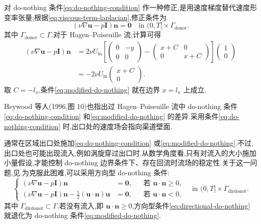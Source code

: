 \begin{example}
对 do-nothing 条件\cref{eq:do-nothing-condition} 作一种修正,是用速度梯度替代速度形变率张量;根据\cref{eq:viscous-term-laplacian},修正条件为
\begin{equation}\label{eq:modified-do-nothing}
  (\nu\nabla\bm{u}-p\bm{I})\bm{n}=\bm{0}
  \quad\text{in }(0,T]\times\Gamma_{\mathrm{donot}}.
\end{equation}
其中 $\Gamma_{\mathrm{donot}}\subset\Gamma$.对于 Hagen--Poiseuille 流,计算可得
\begin{equation*}
\begin{aligned}
  (\nu\nabla\bm{u}-p\bm{I})\bm{n}
  &=2\nu U_{\mathrm{in}}
    \left[
      \begin{pmatrix}0&-y\\0&0\end{pmatrix}
      -\begin{pmatrix}x+C&0\\0&x+C\end{pmatrix}
    \right]
    \begin{pmatrix}1\\0\end{pmatrix}\\
  &=-2\nu U_{\mathrm{in}}\begin{pmatrix}x+C\\0\end{pmatrix}.
\end{aligned}
\end{equation*}
取 $C=-l_x$,条件\cref{eq:modified-do-nothing} 就在边界 $x=l_x$ 上成立.

Heywood 等人(1996,图 10)也指出过 Hagen--Poiseuille 流中 do-nothing 条件\cref{eq:do-nothing-condition} 和\cref{eq:modified-do-nothing} 的差异.采用条件\cref{eq:do-nothing-condition} 时,出口处的速度场会指向渠道壁面.
\end{example}

\begin{note}\label{note:directional-do-nothing}
通常在区域出口处施加\cref{eq:do-nothing-condition} 或\cref{eq:modified-do-nothing}.不过,出口处也可能出现流入,例如涡旋穿过出口时.从数学角度看,只有对流入的大小施加小量假设,才能控制 do-nothing 边界条件下、存在回流时流场的稳定性.关于这一问题,见\textcite{BraackMucha2014}.为克服此困难,可以采用方向型 do-nothing 条件:
\begin{equation}\label{eq:directional-do-nothing}
\left\{
\begin{aligned}
  (\nu\nabla\bm{u}-p\bm{I})\bm{n}&=\bm{0},
    &&\text{若 }\bm{u}\cdot\bm{n}\geq0,\\
  (\nu\nabla\bm{u}-p\bm{I})\bm{n}
   -\frac{1}{2}(\bm{u}\cdot\bm{n})\bm{u}&=\bm{0},
    &&\text{若 }\bm{u}\cdot\bm{n}<0,
\end{aligned}
\right.\quad\text{in }(0,T]\times\Gamma_{\mathrm{dirdonot}}.
\end{equation}
其中 $\Gamma_{\mathrm{dirdonot}}\subset\Gamma$.若没有流入,即 $\bm{u}\cdot\bm{n}\geq0$,方向型条件\cref{eq:directional-do-nothing} 就退化为 do-nothing 条件\cref{eq:modified-do-nothing}.
\end{note}

